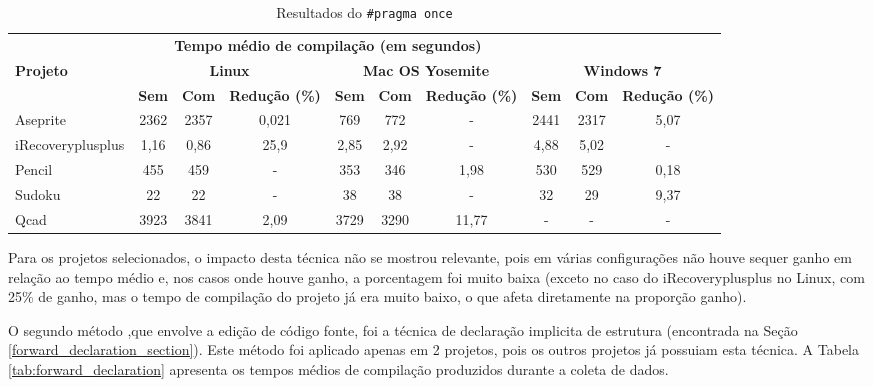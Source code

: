 \begin{table}[!ht]
\tiny
\centering
\caption{Resultados do \texttt{\#pragma once}}
\label{tab:pragma}
\begin{tabular}{lccccccccc}
& \multicolumn{6}{c}{\textbf{Tempo médio de compilação (em segundos)} } \\
\textbf{Projeto} & \multicolumn{3}{c}{\textbf{Linux}} & \multicolumn{3}{c}{\textbf{Mac OS Yosemite}} & \multicolumn{3}{c}{\textbf{Windows 7}} \\ 
& \textbf{Sem } & \textbf{Com }  & \textbf{Redução (\%)} & \textbf{Sem } & \textbf{Com }  & \textbf{Redução (\%)} & \textbf{Sem } & \textbf{Com }  & \textbf{Redução (\%)} \\
\toprule
Aseprite & 2362 &  2357 & 0,021     & 769  & 772 &   - &  2441 & 2317 & 5,07 \\
iRecoveryplusplus & 1,16 & 0,86     & 25,9 & 2,85 & 2,92 & - & 4,88     & 5,02 & - \\
Pencil & 455  &  459  &  - &  353   & 346  & 1,98 &  530      & 529 &  0,18 \\
Sudoku & 22   &  22   &  - &  38    & 38   & -  &  32 & 29 & 9,37 \\ 
Qcad   & 3923 &  3841 &  2,09  &  3729  & 3290 & 11,77   & - & -  & - \\ 
\end{tabular}
\end{table}

Para os projetos selecionados, o impacto desta técnica não se mostrou relevante, pois em várias configurações não houve sequer ganho em relação ao tempo médio e, nos casos onde
houve ganho, a porcentagem foi muito baixa (exceto no caso do iRecoveryplusplus no Linux, com 25\% de ganho, mas o tempo de compilação do projeto já era muito baixo, o que afeta diretamente na proporção ganho).

O segundo método ,que envolve a edição de código fonte, foi a técnica de declaração implicita de estrutura (encontrada na Seção \ref{forward_declaration_section}). Este método foi aplicado apenas em 2 projetos, pois os outros projetos já possuiam esta técnica. A Tabela \ref{tab:forward_declaration} apresenta  os tempos médios de compilação produzidos durante a coleta de dados.

